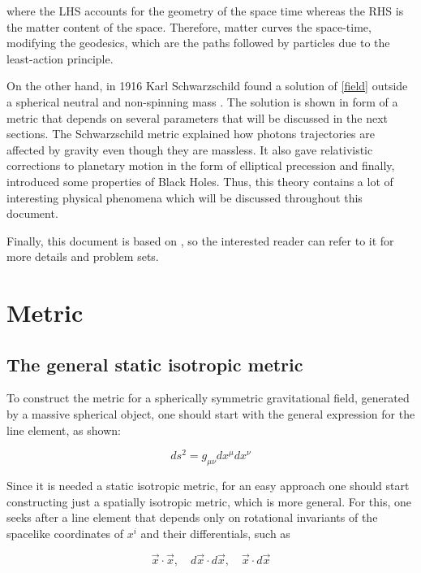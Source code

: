 \documentclass[letterpaper,11pt,onecolumn]{article}
\begin{document}
where the LHS accounts for the geometry of the space time whereas the RHS is the matter content of the space. Therefore, matter curves the space-time, modifying the geodesics, which are the paths followed by particles due to the least-action principle. 

On the other hand, in 1916 Karl Schwarzschild found a solution of \ref{field} outside a spherical neutral and non-spinning mass \cite{1916SPAW.......189S}. The solution is shown in form of a metric that depends on several parameters that will be discussed in the next sections. The Schwarzschild metric explained how photons trajectories are affected by gravity even though they are massless. It also gave relativistic corrections to planetary motion in the form of elliptical precession and finally, introduced some properties of Black Holes. Thus, this theory contains a lot of interesting physical phenomena which will be discussed throughout this document. 

Finally, this document is based on \cite{hobson_efstathiou_lasenby_2006}, so the interested reader can refer to it for more details and problem sets. 

\section{Metric}\label{metric}

\subsection{The general static isotropic metric}

To construct the metric for a spherically symmetric gravitational field, generated by a massive spherical object, one should start with the general expression for the line element, as shown:

\begin{equation}
d s^{2}=g_{\mu \nu} d x^{\mu} d x^{\nu}\label{lineelement}
\end{equation}

Since it is needed a static isotropic metric, for an easy approach one should start constructing just a spatially isotropic metric, which is more general. For this, one seeks after a line element that depends only on rotational invariants of the spacelike coordinates of $x^i$ and their differentials, such as

\begin{equation}
\vec{x} \cdot \vec{x}, \quad d \vec{x} \cdot d \vec{x}, \quad \vec{x} \cdot d \vec{x}\nonumber
\end{equation}
\end{document}

